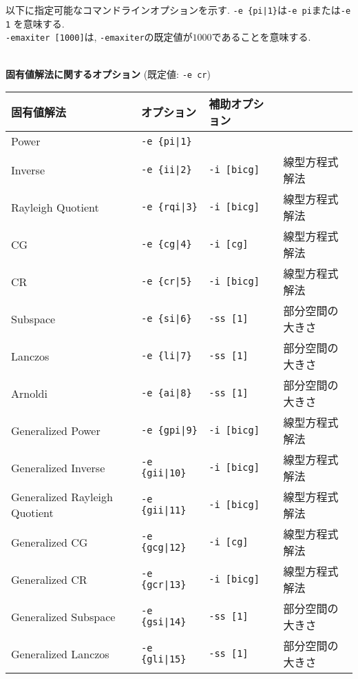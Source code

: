 \documentclass[a4paper]{jarticle}
\begin{document}
{{以下に指定可能なコマンドラインオプションを示す. \verb=-e {pi|1}=は\verb=-e pi=または\verb=-e 1=
を意味する. \\
\verb=-emaxiter [1000]=は, \verb=-emaxiter=の既定値が$1000$であることを意味する. 
\\
\\
\begin{minipage}[t]{\textwidth}
\begin{center}
{\bf 固有値解法に関するオプション} (既定値: \verb=-e cr=) \\
\begin{tabular}{l|lll}\hline\hline
 固有値解法               & オプション              &  補助オプション    & \\ \hline
 Power                   & \verb=-e {pi|1}=        &    \\ 
 Inverse                 & \verb=-e {ii|2}=        &    \verb=-i [bicg]= & 線型方程式解法 \\
 Rayleigh Quotient       & \verb=-e {rqi|3}=       &    \verb=-i [bicg]= & 線型方程式解法 \\
 CG                      & \verb=-e {cg|4}=        &    \verb=-i [cg]= & 線型方程式解法 \\
 CR                      & \verb=-e {cr|5}=        &    \verb=-i [bicg]= & 線型方程式解法 \\
 Subspace                & \verb=-e {si|6}=        &    \verb=-ss [1]= & 部分空間の大きさ \\
 Lanczos                 & \verb=-e {li|7}=        &    \verb=-ss [1]= & 部分空間の大きさ \\
 Arnoldi                 & \verb=-e {ai|8}=        &    \verb=-ss [1]= & 部分空間の大きさ \\
 Generalized Power      & \verb=-e {gpi|9}=       &    \verb=-i [bicg]= & 線型方程式解法 \\ 
 Generalized Inverse    & \verb=-e {gii|10}=       &    \verb=-i [bicg]= & 線型方程式解法 \\
 Generalized Rayleigh Quotient    & \verb=-e {gii|11}=       &    \verb=-i [bicg]= & 線型方程式解法 \\  
 Generalized CG         & \verb=-e {gcg|12}=       &    \verb=-i [cg]= & 線型方程式解法 \\
 Generalized CR         & \verb=-e {gcr|13}=       &    \verb=-i [bicg]= & 線型方程式解法 \\
 Generalized Subspace   & \verb=-e {gsi|14}=       &    \verb=-ss [1]= & 部分空間の大きさ \\
 Generalized Lanczos    & \verb=-e {gli|15}=       &    \verb=-ss [1]= & 部分空間の大きさ \\ 

\end{tabular}
\end{center}
\end{minipage}}}
\end{document}
